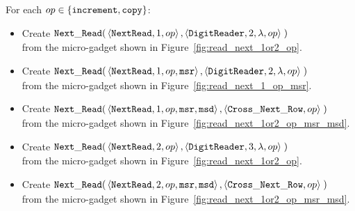 For each $op\in \{ {\tt increment}, {\tt copy} \}$:
\begin{itemize}

    \item Create
    $\begin{aligned}[t]
        {\tt Next\_Read}(& \left\langle {\tt NextRead},     1,          op \right\rangle,
                    \left\langle {\tt DigitReader},  2, \lambda, op \right\rangle \;)
    \end{aligned}$\\from the micro-gadget shown in Figure~\ref{fig:read_next_1or2_op}.

    \item Create
    $\begin{aligned}[t]
        {\tt Next\_Read}(& \left\langle {\tt NextRead},    1,          op, {\tt msr} \right\rangle,
                    \left\langle {\tt DigitReader}, 2, \lambda, op            \right\rangle \;)
    \end{aligned}$\\from the micro-gadget shown in Figure~\ref{fig:read_next_1_op_msr}.

    \item Create
    $\begin{aligned}[t]
        {\tt Next\_Read}(& \left\langle {\tt NextRead}, 1,      op, {\tt msr}, {\tt msd} \right\rangle,
                    \left\langle {\tt Cross\_Next\_Row}, op                       \right\rangle \;)
    \end{aligned}$\\from the micro-gadget shown in Figure~\ref{fig:read_next_1or2_op_msr_msd}.




    \item Create
    $\begin{aligned}[t]
        {\tt Next\_Read}(& \left\langle {\tt NextRead},    2,          op \right\rangle,
                    \left\langle {\tt DigitReader}, 3, \lambda, op \right\rangle \;)
    \end{aligned}$\\from the micro-gadget shown in Figure~\ref{fig:read_next_1or2_op}.

    \item Create
    $\begin{aligned}[t]
        {\tt Next\_Read}(& \left\langle {\tt NextRead}, 2,      op, {\tt msr}, {\tt msd} \right\rangle,
                    \left\langle {\tt Cross\_Next\_Row}, op                       \right\rangle \;)
    \end{aligned}$\\from the micro-gadget shown in Figure~\ref{fig:read_next_1or2_op_msr_msd}.



\end{itemize}
